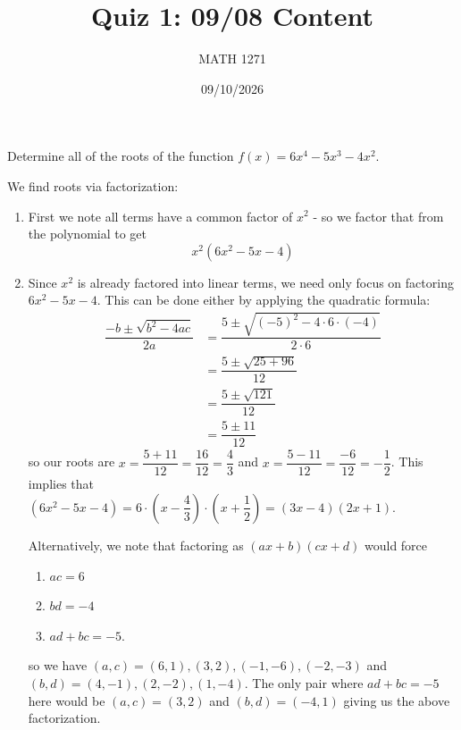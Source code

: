 \documentclass[addpoints,12pt]{exam}
\title{\vspace{-0.5in} Quiz 1: 09/08 Content}
\date{09/10/2026}
\author{MATH 1271}
\begin{document}
  \NameSection
  {\let\newpage\relax\maketitle}

  \PointsSection

  \newpage
  \begin{questions}
    \question[5] Determine all of the roots of the function $f(x) = 6x^4 - 5x^3 - 4x^2$.

    \begin{solution}
      We find roots via factorization:
      \begin{enumerate}
        \item First we note all terms have a common factor of $x^2$ - so we factor that from the polynomial to get
          \begin{equation}
            x^2(6x^2 - 5x - 4)
          \end{equation}
        \item Since $x^2$ is already factored into linear terms, we need only focus on factoring $6x^2 - 5x - 4$.
          This can be done either by applying the quadratic formula:
          \begin{align}
            \dfrac{-b \pm \sqrt{b^2 - 4ac}}{2a} &= \dfrac{5 \pm \sqrt{(-5)^2 - 4 \cdot 6 \cdot (-4)}}{2 \cdot 6} \\
                                                &= \dfrac{5 \pm \sqrt{25 + 96}}{12} \\
                                                &= \dfrac{5 \pm \sqrt{121}}{12} \\
                                                &= \dfrac{5 \pm 11}{12}
          \end{align}
          so our roots are $x = \dfrac{5 + 11}{12} = \dfrac{16}{12} = \dfrac{4}{3}$ and $x = \dfrac{5 - 11}{12} = \dfrac{-6}{12} = -\dfrac{1}{2}$.
          This implies that $(6x^2 - 5x - 4) = 6 \cdot (x - \dfrac{4}{3}) \cdot (x + \dfrac{1}{2}) = (3x - 4)(2x + 1)$.

          Alternatively, we note that factoring as $(ax + b)(cx + d)$ would force
          \begin{enumerate}
            \item $ac = 6$
            \item $bd = -4$
            \item $ad + bc = -5$.
          \end{enumerate}
          so we have $(a,c) = (6,1), (3,2), (-1, -6), (-2, -3)$ and $(b,d) = (4, -1), (2, -2), (1, -4)$.
          The only pair where $ad + bc = -5$ here would be $(a,c) = (3,2)$ and $(b,d) = (-4, 1)$ giving us the above factorization.


\end{enumerate}
\end{solution}
\end{questions}
\end{document}
